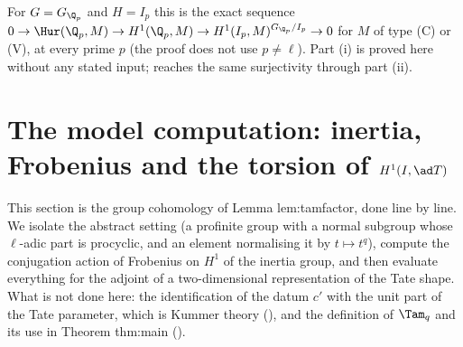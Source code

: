\begin{remark}\label{rem:cohomology:inf-res-zhat-use}
For $G=G_{\Q_p}$ and $H=I_p$ this is the exact sequence $0\to\Hur(\Q_p,M)\to H^1(\Q_p,M)\to H^1(I_p,M)^{G_{\Q_p}/I_p}\to0$ for $M$ of type (C) or (V), at every prime $p$ (the
proof does not use $p\ne\ell$). Part (i) is proved here without any stated input;  reaches the same surjectivity through part (ii).
\end{remark}

\section[The model computation]{The model computation: inertia, Frobenius and the torsion of $H^1(I,\ad T)$}\label{sec:cohomology:model}

This section is the group cohomology of Lemma lem:tamfactor, done line by line. We isolate the abstract setting (a profinite group with a normal subgroup
whose $\ell$-adic part is procyclic, and an element normalising it by $t\mapsto t^q$), compute the conjugation action of Frobenius on $H^1$ of the inertia
group, and then evaluate everything for the adjoint of a two-dimensional representation of the Tate shape. What is not done here: the identification of
the datum $c'$ with the unit part of the Tate parameter, which is Kummer theory (), and the definition of $\Tam_q$ and its use in Theorem
thm:main ().

